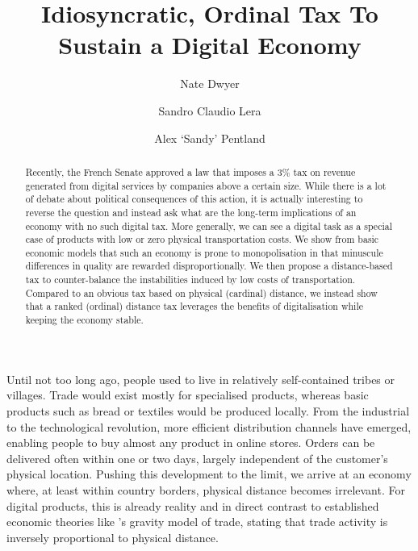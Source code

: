 \documentclass[final,5p,times,twocolumn,11pt,authoryear]{elsarticle}
\numberwithin{equation}{section} %
\begin{document}
\begin{frontmatter}

\title{Idiosyncratic, Ordinal Tax To Sustain a Digital Economy}

\author{Nate Dwyer}

\author{Sandro Claudio Lera}

\author{Alex `Sandy' Pentland}

\address{Massachusetts Institute of Technology, 77 Massachusetts Avenue, 02139 Cambridge, Massachusetts, USA}

\begin{abstract}

Recently, the French Senate approved a law that imposes a $3\%$ tax on revenue generated from digital services by companies above a certain size. 
While there is a lot of debate about political consequences of this action, it is actually interesting to reverse the question and instead ask what are the long-term implications of an economy with no such digital tax. 
More generally, we can see a digital task as a special case of products with low or zero physical transportation costs. 
We show from basic economic models that such an economy is prone to monopolisation in that minuscule differences in quality are rewarded disproportionally. 
We then propose a distance-based tax to counter-balance the instabilities induced by low costs of transportation. 
Compared to an obvious tax based on physical (cardinal) distance, we instead show that a ranked (ordinal) distance tax leverages the benefits of digitalisation while keeping the economy stable. 

\end{abstract} 

\end{frontmatter}

Until not too long ago, people used to live in relatively self-contained tribes or villages. 
Trade would exist mostly for specialised products, whereas basic products such as bread or textiles would be produced locally. 
From the industrial to the technological revolution, more efficient distribution channels have emerged, enabling people to buy almost any product in online stores. 
Orders can be delivered often within one or two days, largely independent of the customer’s physical location. 
Pushing this development to the limit, we arrive at an economy where, at least within country borders, physical distance becomes irrelevant. 
For digital products, this is already reality and in direct contrast to established economic theories like \cite{Isard1954}'s gravity model of trade, stating that trade activity is inversely proportional to physical distance. 
\end{document}
